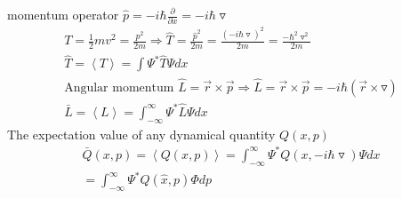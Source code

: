 \documentclass[12pt, a4paper]{article}
\begin{document}
momentum operator $\hat p = -i\hbar \frac{\partial}{\partial x}=-i\hbar \triangledown$
\begin{align*}
T=\frac{1}{2}mv^2=\frac{p^2}{2m}\Rightarrow \hat T =\frac{\hat p^2}{2m}=\frac{(-i\hbar\triangledown)^2}{2m}=\frac{-\hbar^2 \triangledown ^2}{2m}\\
\hat T=\left<T \right>=\int\Psi^*\hat T\Psi dx\\
\text{Angular momentum }\hat{L}=\vec{r}\times \vec{p}\Rightarrow \hat{L}=\vec{r}\times\vec{p}=-i\hbar(\vec{r}\times\triangledown)\\
\bar L =\left< L \right>=\int_{-\infty}^{\infty}\Psi^*\hat L \Psi dx
\end{align*}
The expectation value of any dynamical quantity $Q(x,p)$
\begin{align*}
\bar Q(x,p)=\left< Q(x,p) \right>=\int_{-\infty}^{\infty}\Psi^*Q(x,-i\hbar\triangledown)\Psi dx\\
=\int_{-\infty}^{\infty}\Psi^*Q(\hat x,p)\Phi dp
\end{align*}
\end{document}
